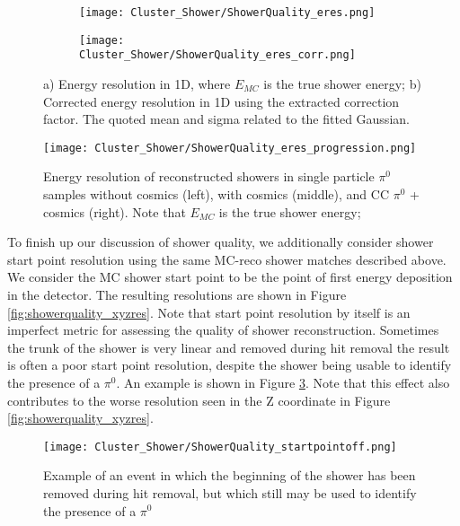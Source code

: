 \documentclass{article}
\begin{document}
\begin{figure}[t!]
\centering
  \begin{subfigure}[t]{0.4\textwidth}
    \centering
\texttt{[image: Cluster\_Shower/ShowerQuality\_eres.png]}
  \caption{ }
  \end{subfigure} 
  \hspace{10mm}
  \begin{subfigure}[t]{0.4\textwidth}
    \centering
\texttt{[image: Cluster\_Shower/ShowerQuality\_eres\_corr.png]}
  \caption{ }
  \end{subfigure} 
\caption{a) Energy resolution in 1D, where $E_{MC}$ is the true shower energy; b) Corrected energy resolution in 1D using the extracted correction factor. The quoted mean and sigma related to the fitted Gaussian.}
\label{fig:showerquality_eres_corr}
\end{figure}

\begin{figure}[t!]
\centering
 \texttt{[image: Cluster\_Shower/ShowerQuality\_eres\_progression.png]}
 \caption{Energy resolution of reconstructed showers in single particle $\pi^0$ samples without cosmics (left), with cosmics (middle), and CC $\pi^0$ + cosmics (right). Note that $E_{MC}$ is the true shower energy; }
\label{fig:showerquality_eres_series}
\end{figure}


To finish up our discussion of shower quality, we additionally consider shower start point resolution using the same MC-reco shower matches described above. We consider the MC shower start point to be the point of first energy deposition in the detector. The resulting resolutions are shown in Figure \ref{fig:showerquality_xyzres}. Note that start point resolution by itself is an imperfect metric for assessing the quality of shower reconstruction. Sometimes the trunk of the shower is very linear and removed during hit removal the result is often a poor start point resolution, despite the shower being usable to identify the presence of a $\pi^0$. An example is shown in Figure \ref{fig:showerquality_startpointoff}.  Note that this effect also contributes to the worse resolution seen in the Z coordinate in Figure \ref{fig:showerquality_xyzres}.

\begin{figure}[h!]
\centering
\texttt{[image: Cluster\_Shower/ShowerQuality\_startpointoff.png]}
\caption{Example of an event in which the beginning of the shower has been removed during hit removal, but which still may be used to identify the presence of a $\pi^0$ }
\label{fig:showerquality_startpointoff}
\end{figure}
\end{document}
